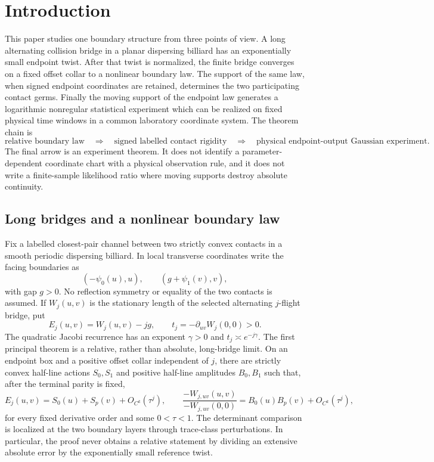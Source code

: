 \section{Introduction}
\label{sec:introduction}

This paper studies one boundary structure from three points of view.  A long
alternating collision bridge in a planar dispersing billiard has an
exponentially small endpoint twist.  After that twist is normalized, the
finite bridge converges on a fixed offset collar to a nonlinear boundary law.
The support of the same law, when signed endpoint coordinates are retained,
determines the two participating contact germs.  Finally the moving support
of the endpoint law generates a logarithmic nonregular statistical
experiment which can be realized on fixed physical time windows in a common
laboratory coordinate system.  The theorem chain is
\[
 \boxed{\text{relative boundary law}}
 \quad\Longrightarrow\quad
 \boxed{\text{signed labelled contact rigidity}}
 \quad\Longrightarrow\quad
 \boxed{\text{physical endpoint-output Gaussian experiment}}.
\]
The final arrow is an experiment theorem.  It does not identify a
parameter-dependent coordinate chart with a physical observation rule, and it
does not write a finite-sample likelihood ratio where moving supports destroy
absolute continuity.

\subsection{Long bridges and a nonlinear boundary law}

Fix a labelled closest-pair channel between two strictly convex contacts in a
smooth periodic dispersing billiard.  In local transverse coordinates write
the facing boundaries as
\[
 (-\psi_0(u),u),\qquad (g+\psi_1(v),v),
\]
with gap $g>0$.  No reflection symmetry or equality of the two contacts is
assumed.  If $W_j(u,v)$ is the stationary length of the selected alternating
$j$-flight bridge, put
\[
 E_j(u,v)=W_j(u,v)-jg,
 \qquad
 t_j=-\partial_{uv}W_j(0,0)>0.
\]
The quadratic Jacobi recurrence has an exponent $\gamma>0$ and
$t_j\asymp e^{-j\gamma}$.  The first principal theorem is a relative, rather
than absolute, long-bridge limit.  On an endpoint box and a positive offset
collar independent of $j$, there are strictly convex half-line actions
$S_0,S_1$ and positive half-line amplitudes $B_0,B_1$ such that, after the
terminal parity is fixed,
\begin{equation}\label{eq:intro-v21-relative}
 E_j(u,v)=S_0(u)+S_p(v)+O_{C^k}(\tau^j),
 \qquad
 \frac{-W_{j,uv}(u,v)}{-W_{j,uv}(0,0)}
 =B_0(u)B_p(v)+O_{C^k}(\tau^j),
\end{equation}
for every fixed derivative order and some $0<\tau<1$.  The determinant
comparison is localized at the two boundary layers through trace-class
perturbations.  In particular, the proof never obtains a relative statement
by dividing an extensive absolute error by the exponentially small reference
twist.

